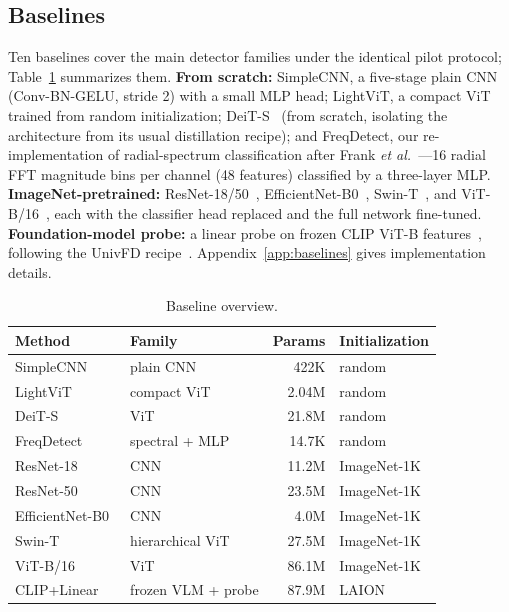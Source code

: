\documentclass[journal]{IEEEtran}
\begin{document}
\subsection{Baselines}
\label{sec:baselines}
Ten baselines cover the main detector families under the identical pilot protocol; Table~\ref{tab:baseline_overview} summarizes them. \textbf{From scratch:} SimpleCNN, a five-stage plain CNN (Conv-BN-GELU, stride 2) with a small MLP head; LightViT, a compact ViT trained from random initialization; DeiT-S~\cite{touvron2021} (from scratch, isolating the architecture from its usual distillation recipe); and FreqDetect, our re-implementation of radial-spectrum classification after Frank \textit{et al.}~\cite{frank2020}---16 radial FFT magnitude bins per channel (48 features) classified by a three-layer MLP. \textbf{ImageNet-pretrained:} ResNet-18/50~\cite{he2016}, EfficientNet-B0~\cite{tan2019}, Swin-T~\cite{liu2021}, and ViT-B/16~\cite{dosovitskiy2021}, each with the classifier head replaced and the full network fine-tuned. \textbf{Foundation-model probe:} a linear probe on frozen CLIP ViT-B features~\cite{radford2021}, following the UnivFD recipe~\cite{ojha2023}. Appendix~\ref{app:baselines} gives implementation details.

\begin{table}[!t]
\renewcommand{\arraystretch}{1.2}
\caption{Baseline overview.}
\label{tab:baseline_overview}
\centering
\setlength{\tabcolsep}{4pt}
\begin{tabular}{llrl}
\toprule
Method & Family & Params & Initialization \\
\midrule
SimpleCNN   & plain CNN        & 422K   & random \\
LightViT    & compact ViT      & 2.04M  & random \\
DeiT-S~\cite{touvron2021} & ViT & 21.8M & random \\
FreqDetect~\cite{frank2020} & spectral + MLP & 14.7K & random \\
ResNet-18~\cite{he2016}   & CNN & 11.2M & ImageNet-1K \\
ResNet-50~\cite{he2016}   & CNN & 23.5M & ImageNet-1K \\
EfficientNet-B0~\cite{tan2019} & CNN & 4.0M & ImageNet-1K \\
Swin-T~\cite{liu2021}     & hierarchical ViT & 27.5M & ImageNet-1K \\
ViT-B/16~\cite{dosovitskiy2021} & ViT & 86.1M & ImageNet-1K \\
CLIP+Linear~\cite{radford2021,ojha2023} & frozen VLM + probe & 87.9M & LAION \\
\bottomrule
\end{tabular}
\end{table}
\end{document}
